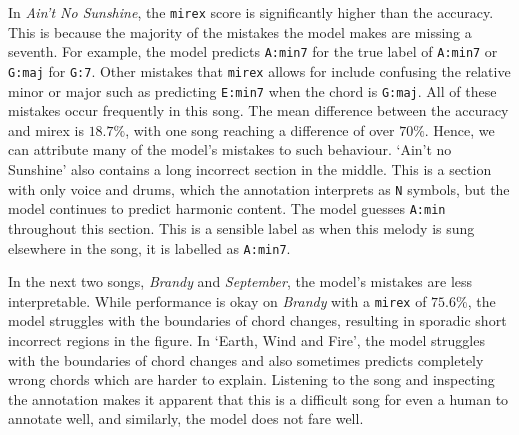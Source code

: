 In \emph{Ain't No Sunshine}, the \texttt{mirex} score is significantly higher than the accuracy. This is because the majority of the mistakes the model makes are missing a seventh. For example, the model predicts \texttt{A:min7} for the true label of \texttt{A:min7} or \texttt{G:maj} for \texttt{G:7}. Other mistakes that \texttt{mirex} allows for include confusing the relative minor or major such as predicting \texttt{E:min7} when the chord is \texttt{G:maj}. All of these mistakes occur frequently in this song. The mean difference between the accuracy and mirex is $18.7\%$, with one song reaching a difference of over $70\%$. Hence, we can attribute many of the model's mistakes to such behaviour. `Ain't no Sunshine' also contains a long incorrect section in the middle. This is a section with only voice and drums, which the annotation interprets as \texttt{N} symbols, but the model continues to predict harmonic content. The model guesses \texttt{A:min} throughout this section. This is a sensible label as when this melody is sung elsewhere in the song, it is labelled as \texttt{A:min7}.

In the next two songs, \emph{Brandy} and \emph{September}, the model's mistakes are less interpretable. While performance is okay on \emph{Brandy} with a \texttt{mirex} of $75.6\%$, the model struggles with the boundaries of chord changes, resulting in sporadic short incorrect regions in the figure. In `Earth, Wind and Fire', the model struggles with the boundaries of chord changes and also sometimes predicts completely wrong chords which are harder to explain. Listening to the song and inspecting the annotation makes it apparent that this is a difficult song for even a human to annotate well, and similarly, the model does not fare well.

